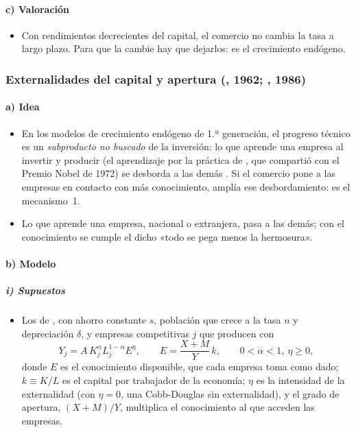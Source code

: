 \documentclass[11pt]{article}
\begin{document}
\paragraph{c) Valoración}

\begin{itemize}
\item Con rendimientos decrecientes del capital, el comercio no cambia la tasa a largo plazo. Para que la cambie hay que dejarlos: es el crecimiento endógeno.
\end{itemize}

\subsubsection{Externalidades del capital y apertura (, 1962; , 1986)}\label{sec:externalidades}

\paragraph{a) Idea}

\begin{itemize}
\item En los modelos de crecimiento endógeno de 1.ª generación, el progreso técnico es un \emph{subproducto no buscado} de la inversión: lo que aprende una empresa al invertir y producir (el aprendizaje por la práctica de \textcite{Arrow1962Learning}, que compartió con  el Premio Nobel de 1972) se desborda a las demás\nocite{Romer1986Increasing} . Si el comercio pone a las empresas en contacto con más conocimiento, amplía ese desbordamiento: es el mecanismo~1.
\item Lo que aprende una empresa, nacional o extranjera, pasa a las demás; con el conocimiento se cumple el dicho «todo se pega menos la hermosura».
\end{itemize}

\paragraph{b) Modelo}

\subparagraph{i) Supuestos}

\begin{itemize}
\item Los de , con ahorro constante $s$, población que crece a la tasa $n$ y depreciación $\delta$, y empresas competitivas $j$ que producen con
  \begin{equation}\label{eq:externalidad-apertura}
  Y_j=A\,K_j^{\alpha}L_j^{1-\alpha}E^{\eta},\qquad E=\frac{X+M}{Y}\,k,\qquad 0<\alpha<1,\ \eta\geq0,
  \end{equation}
  donde $E$ es el conocimiento disponible, que cada empresa toma como dado; $k\equiv K/L$ es el capital por trabajador de la economía; $\eta$ es la intensidad de la externalidad (con $\eta=0$, una Cobb-Douglas sin externalidad), y el grado de apertura, $(X+M)/Y$, multiplica el conocimiento al que acceden las empresas.
\end{itemize}
\end{document}

